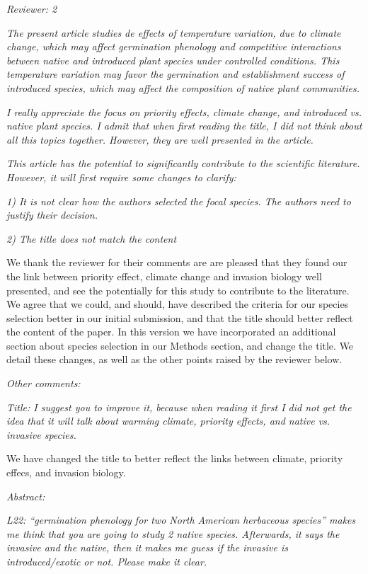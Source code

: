 \documentclass[11pt]{article}
\begin{document}
\emph{Reviewer: 2}

\emph{The present article studies de effects of temperature variation, due to climate change, which may affect germination phenology and competitive interactions between native and introduced plant species under controlled conditions. This temperature variation may favor the germination and establishment success of introduced species, which may affect the composition of native plant communities.}

\emph{I really appreciate the focus on priority effects, climate change, and introduced vs. native plant species. I admit that when first reading the title, I did not think about all this topics together. However, they are well presented in the article.}

\emph{This article has the potential to significantly contribute to the scientific literature. However, it will first require some changes to clarify:}

\emph{1) It is not clear how the authors selected the focal species. The authors need to justify their decision.}

\emph{2) The title does not match the content}

We thank the reviewer for their comments are are pleased that they found our the link between priority effect, climate change and invasion biology well presented, and see the potentially for this study to contribute to the literature. We agree that we could, and should, have described the criteria for our species selection better in our initial submission, and that the title should better reflect the content of the paper. In this version we have incorporated an additional section about species selection in our Methods section, and change the title. We detail these changes, as well as the other points raised by the reviewer below.

\emph{Other comments:}

\emph{Title: I suggest you to improve it, because when reading it first I did not get the idea that it will talk about warming climate, priority effects, and native vs. invasive species.}

We have changed the title to  better reflect the links between climate, priority effecs, and invasion biology. 

\emph{ Abstract:} 

\emph{L22: “germination phenology for two North American herbaceous species” makes me think that you are going to study 2 native species. Afterwards, it says the invasive and the native, then it makes me guess if the invasive is introduced/exotic or not. Please make it clear.}
\end{document}
